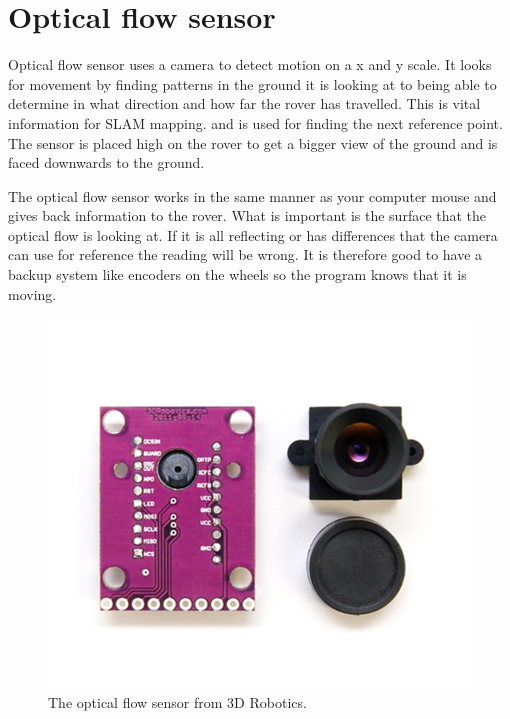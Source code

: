 \clearpage
\section{Optical flow sensor}

Optical flow sensor uses a camera to detect motion on a x and y scale. It looks for movement by finding patterns in the ground it is looking at to being able to determine in what direction and how far the rover has travelled. This is vital information for SLAM mapping. and is used for finding the next reference point. The sensor is placed high on the rover to get a bigger view of the ground and is faced downwards to the ground.

The optical flow sensor works in the same manner as your computer mouse and gives back information to the rover. What is important is the surface that the optical flow is looking at. If it is all reflecting or has differences that the camera can use for reference the reading will be wrong. It is therefore good to have a backup system like encoders on the wheels so the program knows that it is moving.


\begin{figure}[H]
	\centering
	\includegraphics[width=.3\linewidth]{images/optical.jpg}
	\caption{The optical flow sensor from 3D Robotics.}
\end{figure}


